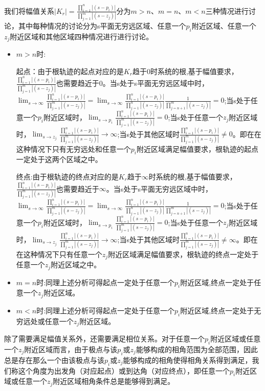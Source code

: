 \documentclass{article}
\numberwithin{equation}{section}
\numberwithin{figure}{section}
\begin{document}
我们将幅值关系$|K_r|=\frac{\prod_{i=1}^{n}|(s-p_i)|}{\prod_{j=1}^{m}|(s-z_j)|}$分为$m>n$、$m=n$、$m<n$三种情况进行讨论，其中每种情况的讨论分为s平面无穷远区域、任意一个$p_i$附近区域、任意一个$z_j$附近区域和其他区域四种情况进行进行讨论。

\begin{itemize}
    \item $m>n$时:
    
    起点：由于根轨迹的起点对应的是$K_r$趋于0时系统的根,基于幅值要求，$\frac{\prod_{i=1}^{n}|(s-p_i)|}{\prod_{j=1}^{m}|(s-z_j)|}$也需要趋近于0。当s处于s平面无穷远区域中时，$\lim_{s\rightarrow \infty}\frac{\prod_{i=1}^{n}|(s-p_i)|}{\prod_{j=1}^{m}|(s-z_j)|}=\lim_{s\rightarrow \infty}\frac{\prod_{i=1}^{n}|(s-p_i)|}{\prod_{j=1}^{n}|(s-z_j)|}\frac{1}{\prod_{j=n+1}^{m}|(s-z_j)|}=0$;当s处于任意一个$p_i$附近区域时，$\lim_{s\rightarrow p_i}\frac{\prod_{i=1}^{n}|(s-p_i)|}{\prod_{j=1}^{m}|(s-z_j)|}=0$;当s处于任意一个$z_j$附近区域时，$\lim_{s\rightarrow z_j}\frac{\prod_{i=1}^{n}|(s-p_i)|}{\prod_{j=1}^{m}|(s-z_j)|}\rightarrow \infty$;当s处于其他区域时$\frac{\prod_{i=1}^{n}|(s-p_i)|}{\prod_{j=1}^{m}|(s-z_j)|}\neq 0$。即在在这种情况下只有无穷远处和任意一个$p_i$附近区域满足幅值要求，根轨迹的起点一定处于这两个区域之中。

    终点:由于根轨迹的终点对应的是$K_r$趋于$\infty$时系统的根,基于幅值要求，$\frac{\prod_{i=1}^{n}|(s-p_i)|}{\prod_{j=1}^{m}|(s-z_j)|}$也需要趋近于$\infty$。当s处于s平面无穷远区域中时，$\lim_{s\rightarrow \infty}\frac{\prod_{i=1}^{n}|(s-p_i)|}{\prod_{j=1}^{m}|(s-z_j)|}=\lim_{s\rightarrow \infty}\frac{\prod_{i=1}^{n}|(s-p_i)|}{\prod_{j=1}^{n}|(s-z_j)|}\frac{1}{\prod_{j=n+1}^{m}|(s-z_j)|}=0$;当s处于任意一个$p_i$附近区域时，$\lim_{s\rightarrow p_i}\frac{\prod_{i=1}^{n}|(s-p_i)|}{\prod_{j=1}^{m}|(s-z_j)|}=0$;当s处于任意一个$z_j$附近区域时，$\lim_{s\rightarrow z_j}\frac{\prod_{i=1}^{n}|(s-p_i)|}{\prod_{j=1}^{m}|(s-z_j)|}\rightarrow \infty$;当s处于其他区域时$\frac{\prod_{i=1}^{n}|(s-p_i)|}{\prod_{j=1}^{m}|(s-z_j)|} \neq \infty$。即在在这种情况下只有任意一个$z_j$附近区域满足幅值要求，根轨迹的终点一定处于任意一个$z_j$附近区域之中。
    \item $m=n$时:同理上述分析可得起点一定处于任意一个$p_i$附近区域,终点一定处于任意一个$z_j$附近区域。
    \item $m<n$时:同理上述分析可得起点一定处于任意一个$p_i$附近区域,终点一定处于无穷远处或任意一个$z_j$附近区域。
\end{itemize}

除了需要满足幅值关系外，还需要满足相位关系。对于任意一个$p_i$附近区域或任意一个$z_j$附近区域而言，由于极点与该$p_i$或$z_j$能够构成的相角范围为全部范围，因此总是存在那么一个由该极点与该$p_i$或$z_j$能够构成的相角使得相角关系得到满足，我们称这个角度为出发角（对应起点）或到达角（对应终点），即任意一个$p_i$附近区域或任意一个$z_j$附近区域相角条件总是能够得到满足。
\end{document}
